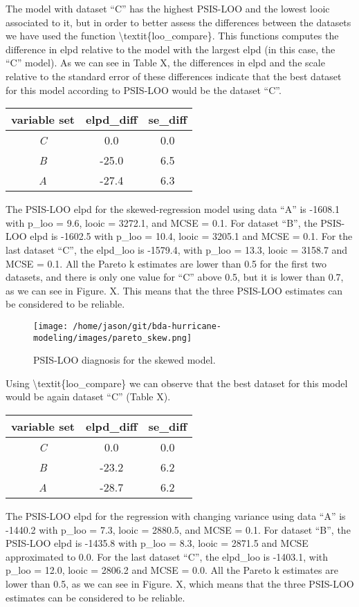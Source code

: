 \documentclass[
]{article}
\begin{document}
The model with dataset ``C'' has the highest PSIS-LOO and the lowest
looic associated to it, but in order to better assess the differences
between the datasets we have used the function
\textbackslash textit\{loo\_compare\}. This functions computes the
difference in elpd relative to the model with the largest elpd (in this
case, the ``C'' model). As we can see in Table X, the differences in
elpd and the scale relative to the standard error of these differences
indicate that the best dataset for this model according to PSIS-LOO
would be the dataset ``C''.

\begin{longtable}[]{@{}ccc@{}}
\toprule
variable set & \textbf{elpd\_diff} & \textbf{se\_diff}\tabularnewline
\midrule
\endhead
\emph{C} & 0.0 & 0.0\tabularnewline
\emph{B} & -25.0 & 6.5\tabularnewline
\emph{A} & -27.4 & 6.3\tabularnewline
\bottomrule
\end{longtable}

The PSIS-LOO elpd for the skewed-regression model using data ``A'' is
-1608.1 with p\_loo = 9.6, looic = 3272.1, and MCSE = 0.1. For dataset
``B'', the PSIS-LOO elpd is -1602.5 with p\_loo = 10.4, looic = 3205.1
and MCSE = 0.1. For the last dataset ``C'', the elpd\_loo is -1579.4,
with p\_loo = 13.3, looic = 3158.7 and MCSE = 0.1. All the Pareto k
estimates are lower than 0.5 for the first two datasets, and there is
only one value for ``C'' above 0.5, but it is lower than 0.7, as we can
see in Figure. X. This means that the three PSIS-LOO estimates can be
considered to be reliable.

\begin{figure}
\centering
\texttt{[image: /home/jason/git/bda-hurricane-modeling/images/pareto\_skew.png]}
\caption{PSIS-LOO diagnosis for the skewed model.}
\end{figure}

Using \textbackslash textit\{loo\_compare\} we can observe that the best
dataset for this model would be again dataset ``C'' (Table X).

\begin{longtable}[]{@{}ccc@{}}
\toprule
variable set & \textbf{elpd\_diff} & \textbf{se\_diff}\tabularnewline
\midrule
\endhead
\emph{C} & 0.0 & 0.0\tabularnewline
\emph{B} & -23.2 & 6.2\tabularnewline
\emph{A} & -28.7 & 6.2\tabularnewline
\bottomrule
\end{longtable}

The PSIS-LOO elpd for the regression with changing variance using data
``A'' is -1440.2 with p\_loo = 7.3, looic = 2880.5, and MCSE = 0.1. For
dataset ``B'', the PSIS-LOO elpd is -1435.8 with p\_loo = 8.3, looic =
2871.5 and MCSE approximated to 0.0. For the last dataset ``C'', the
elpd\_loo is -1403.1, with p\_loo = 12.0, looic = 2806.2 and MCSE = 0.0.
All the Pareto k estimates are lower than 0.5, as we can see in Figure.
X, which means that the three PSIS-LOO estimates can be considered to be
reliable.
\end{document}
